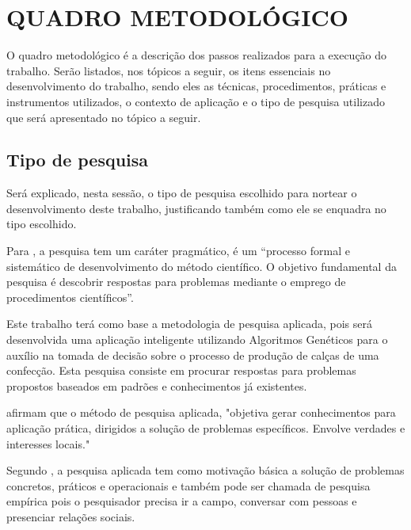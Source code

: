 
\chapter{QUADRO METODOLÓGICO}
\par O quadro metodológico é a descrição dos passos realizados para a 
execução do trabalho. Serão listados, nos tópicos a seguir, os itens essenciais
no desenvolvimento do trabalho, sendo eles as técnicas, procedimentos, práticas e instrumentos
utilizados, o contexto de aplicação e o tipo de pesquisa utilizado que será apresentado no tópico a seguir.

\section{Tipo de pesquisa}

\par Será explicado, nesta sessão, o tipo de pesquisa escolhido para nortear o
desenvolvimento deste trabalho, justificando também como ele se enquadra no tipo
escolhido.

\par Para , a pesquisa tem um caráter
pragmático, é um “processo formal e sistemático de desenvolvimento do método científico. 
O objetivo fundamental da pesquisa é descobrir respostas para problemas mediante
o emprego de procedimentos científicos”.

\par Este trabalho terá como base a metodologia de pesquisa aplicada, pois
será desenvolvida uma aplicação inteligente utilizando Algoritmos Genéticos para
o auxílio na tomada de decisão sobre o processo de produção de calças de uma
confecção. Esta pesquisa consiste em procurar respostas para problemas propostos
baseados em padrões e conhecimentos já existentes.

\par {} afirmam que o método de
pesquisa aplicada, "objetiva gerar conhecimentos para aplicação prática, dirigidos a
solução de problemas específicos. Envolve verdades e interesses locais."  

\par Segundo , a pesquisa
aplicada tem como motivação básica a solução de problemas
concretos, práticos e operacionais e também pode ser chamada de pesquisa
empírica pois o pesquisador precisa ir a campo, conversar com pessoas e
presenciar relações sociais.

